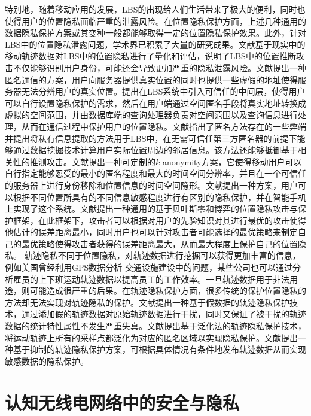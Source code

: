 特别地，随着移动应用的发展，LBS的出现给人们生活带来了极大的便利，同时也使得用户的位置隐私面临严重的泄露风险。在位置隐私保护方面，上述几种通用的数据隐私保护方案或其变种一般都能够取得一定的位置隐私保护效果。此外，针对LBS中的位置隐私泄露问题，学术界已积累了大量的研究成果。文献\cite{freudiger2012evaluating}基于现实中的移动轨迹数据对LBS中的位置隐私进行了量化和评估，说明了LBS中的位置推断攻击不仅能够识别用户身份，可能还会导致更加严重的隐私泄露风险。文献\cite{kido2005anonymous}提出一种匿名通信的方案，用户向服务器提供真实位置的同时也提供一些虚假的地址使得服务器无法分辨用户的真实位置。\cite{mokbel2006new}提出在LBS系统中引入可信任的中间层，使得用户可以自行设置隐私保护的需求，然后在用户端通过空间匿名手段将真实地址转换成虚拟的空间范围，并由数据库端的查询处理器负责对空间范围以及查询信息进行处理，从而在通信过程中保护用户的位置隐私。文献\cite{ghinita2008private}指出了匿名方法存在的一些弊端并提出将私有信息提取的方法用于LBS中，在无需可信任第三方匿名器的前提下能够通过数据挖掘技术计算用户实际位置周边的邻居信息。该方法还能够抵御基于相关性的推测攻击。文献\cite{gedik2005location}提出一种可定制的$k$-anonymity方案，它使得移动用户可以自行指定能够忍受的最小的匿名程度和最大的时间空间分辨率，并且在一个可信任的服务器上进行身份移除和位置信息的时间空间隐形。文献\cite{xu2009feeling}提出一种方案，用户可以根据不同位置所具有的不同信息敏感程度进行有区别的隐私保护，并在智能手机上实现了这个系统。文献\cite{shokri2012protecting}提出一种通用的基于贝叶斯零和博弈的位置隐私攻击与保护框架，在此框架下，攻击者可以根据对用户的先验知识对其进行最优的攻击使得他估计的误差距离最小，同时用户也可以针对攻击者可能选择的最优策略来制定自己的最优策略使得攻击者获得的误差距离最大，从而最大程度上保护自己的位置隐私。
轨迹隐私不同于位置隐私，对轨迹数据进行挖掘可以获得更加丰富的信息，例如美国曾经利用GPS数据分析
交通设施建设中的问题，某些公司也可以通过分析雇员的上下班运动轨迹数据以提高员工的工作效率。一旦轨迹数据用于非法用途，则可能造成很严重的后果。在轨迹隐私保护方面，很多传统的保护位置隐私的方法却无法实现对轨迹隐私的保护。文献\cite{luper2007spatial}提出一种基于假数据的轨迹隐私保护技术，通过添加假的轨迹数据对原始轨迹数据进行干扰，同时又保证了被干扰的轨迹数据的统计特性属性不发生严重失真。文献\cite{abul2008never}提出基于泛化法的轨迹隐私保护技术，将运动轨迹上所有的采样点都泛化为对应的匿名区域以实现隐私保护。文献\cite{terrovitis2008privacy}提出一种基于抑制的轨迹隐私保护方案，可根据具体情况有条件地发布轨迹数据从而实现敏感数据的隐私保护。

\section{认知无线电网络中的安全与隐私}

